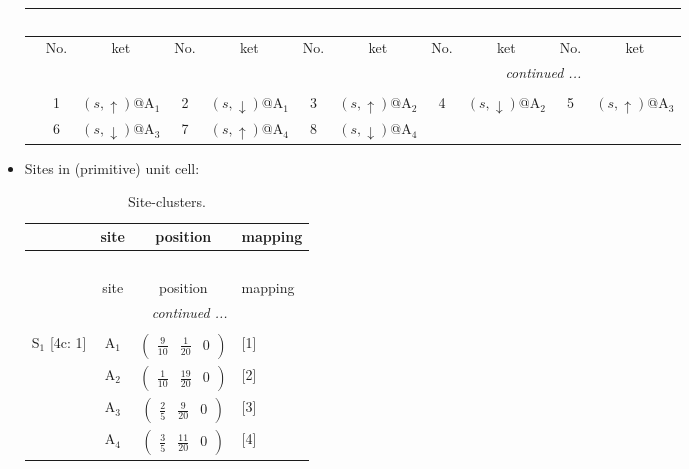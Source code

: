 \documentclass[fleqn,10pt,landscape]{article}
\begin{document}
\begin{itemize}
\begin{center}
\begin{longtable}{c|cc|cc|cc|cc|cc}
\multicolumn{10}{l}{\tablename\ \thetable{}} \\
 \hline \hline
 & No. & ket & No. & ket & No. & ket & No. & ket & No. & ket \\ \hline \endhead

 \hline \hline
\multicolumn{10}{r}{\footnotesize\it continued ...} \\ \endfoot

 \hline \hline
\multicolumn{10}{r}{} \\ \endlastfoot

 & 1 & $(s,\uparrow)$@A$_{1}$ & 2 & $(s,\downarrow)$@A$_{1}$ & 3 & $(s,\uparrow)$@A$_{2}$ & 4 & $(s,\downarrow)$@A$_{2}$ & 5 & $(s,\uparrow)$@A$_{3}$ \\
& 6 & $(s,\downarrow)$@A$_{3}$ & 7 & $(s,\uparrow)$@A$_{4}$ & 8 & $(s,\downarrow)$@A$_{4}$ &  &  &  &  \\
\end{longtable}
\end{center}

\item Sites in (primitive) unit cell:
\begin{center}
\renewcommand{\arraystretch}{1.3}
\begin{longtable}{cc|c|l}
\caption{Site-clusters.}
 \\
 \hline \hline
 & site & position & mapping \\ \hline \endfirsthead

\multicolumn{3}{l}{\tablename\ \thetable{}} \\
 \hline \hline
 & site & position & mapping \\ \hline \endhead

 \hline \hline
\multicolumn{3}{r}{\footnotesize\it continued ...} \\ \endfoot

 \hline \hline
\multicolumn{3}{r}{} \\ \endlastfoot

S$_{1}$ [4c: 1] & A$_1$ & $\begin{pmatrix} \frac{9}{10} & \frac{1}{20} & 0 \end{pmatrix}$ & [1] \\
& A$_2$ & $\begin{pmatrix} \frac{1}{10} & \frac{19}{20} & 0 \end{pmatrix}$ & [2] \\
& A$_3$ & $\begin{pmatrix} \frac{2}{5} & \frac{9}{20} & 0 \end{pmatrix}$ & [3] \\
& A$_4$ & $\begin{pmatrix} \frac{3}{5} & \frac{11}{20} & 0 \end{pmatrix}$ & [4] \\
\end{longtable}
\end{center}


\end{itemize}
\end{document}
